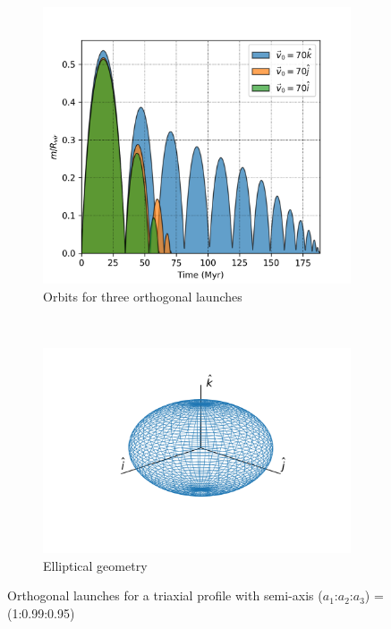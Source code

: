 	\begin{figure}[h]
		\centering
		\begin{subfigure}[b]{0.49\textwidth}
			\includegraphics[width = \textwidth]{"../Files/Week 7/orthogonal_triaxial"}
			\caption{Orbits for three orthogonal launches}
			\label{fig: orthogonalLaunches}
		\end{subfigure}
		~ 
		\begin{subfigure}[b]{0.49\textwidth}
			\includegraphics[width=\textwidth]{"../Files/Week 7/ellipsoid"}
			\caption{Elliptical geometry}
		\end{subfigure}
		\caption{Orthogonal launches for a triaxial profile with semi-axis ($a_1$:$a_2$:$a_3$) = (1:0.99:0.95)}
		\label{fig: mainOrthogonalLaunches}
	\end{figure}